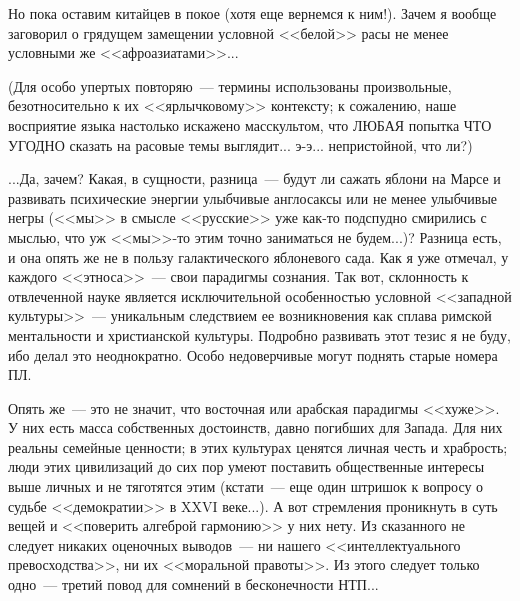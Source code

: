 \documentclass{scrbook}
\newcommand{\flqq}{<<}
\newcommand{\frqq}{>>}
\newcommand{\mdash}{~--- }
\begin{document}
Но пока оставим китайцев в покое (хотя еще вернемся к ним!). Зачем я вообще заговорил о грядущем замещении условной {\flqq}белой{\frqq} расы не менее условными же {\flqq}афроазиатами{\frqq}...

(Для особо упертых повторяю{\mdash}термины использованы произвольные, безотносительно к их {\flqq}ярлычковому{\frqq} контексту; к сожалению, наше восприятие языка настолько искажено масскультом, что ЛЮБАЯ попытка ЧТО УГОДНО сказать на расовые темы выглядит... э-э... непристойной, что ли?)

...Да, зачем? Какая, в сущности, разница{\mdash}будут ли сажать яблони на Марсе и развивать психические энергии улыбчивые англосаксы или не менее улыбчивые негры ({\flqq}мы{\frqq} в смысле {\flqq}русские{\frqq} уже как-то подспудно смирились с мыслью, что уж {\flqq}мы{\frqq}-то этим точно заниматься не будем...)? Разница есть, и она опять же не в пользу галактического яблоневого сада. Как я уже отмечал, у каждого {\flqq}этноса{\frqq}{\mdash}свои парадигмы сознания. Так вот, склонность к отвлеченной науке является исключительной особенностью условной {\flqq}западной культуры{\frqq}{\mdash}уникальным следствием ее возникновения как сплава римской ментальности и христианской культуры. Подробно развивать этот тезис я не буду, ибо делал это неоднократно. Особо недоверчивые могут поднять старые номера ПЛ.

Опять же{\mdash}это не значит, что восточная или арабская парадигмы {\flqq}хуже{\frqq}. У них есть масса собственных достоинств, давно погибших для Запада. Для них реальны семейные ценности; в этих культурах ценятся личная честь и храбрость; люди этих цивилизаций до сих пор умеют поставить общественные интересы выше личных и не тяготятся этим (кстати{\mdash}еще один штришок к вопросу о судьбе {\flqq}демократии{\frqq} в XXVI веке...). А вот стремления проникнуть в суть вещей и {\flqq}поверить алгеброй гармонию{\frqq} у них нету. Из сказанного не следует никаких оценочных выводов{\mdash}ни нашего {\flqq}интеллектуального превосходства{\frqq}, ни их {\flqq}моральной правоты{\frqq}. Из этого следует только одно{\mdash}третий повод для сомнений в бесконечности НТП...
\end{document}
